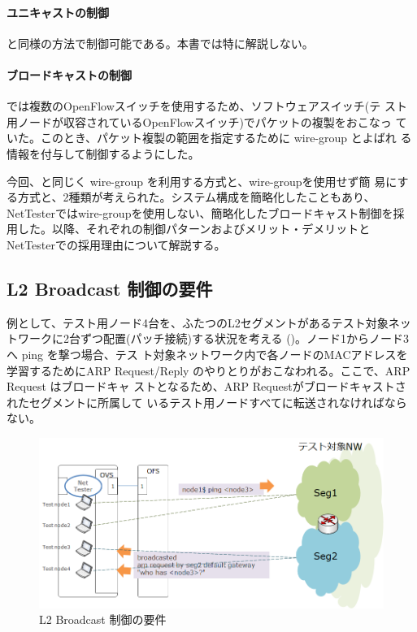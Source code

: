     \paragraph{ユニキャストの制御}

\lopj と同様の方法で制御可能である。本書では特に解説しない。

    \paragraph{ブロードキャストの制御}

\lopj では複数のOpenFlowスイッチを使用するため、ソフトウェアスイッチ(テ
スト用ノードが収容されているOpenFlowスイッチ)でパケットの複製をおこなっ
ていた。このとき、パケット複製の範囲を指定するために wire-group とよばれ
る情報を付与して制御するようにした。

今回、\lopj と同じく wire-group を利用する方式と、wire-groupを使用せず簡
易にする方式と、2種類が考えられた。システム構成を簡略化したこともあり、
NetTesterではwire-groupを使用しない、簡略化したブロードキャスト制御を採
用した。以降、それぞれの制御パターンおよびメリット・デメリットと
NetTesterでの採用理由について解説する。

  \subsection{L2 Broadcast 制御の要件}
  \label{sec:l2bcctrl-requirement}

例として、テスト用ノード4台を、ふたつのL2セグメントがあるテスト対象ネッ
トワークに2台ずつ配置(パッチ接続)する状況を考える
()。ノード1からノード3へ ping を撃つ場合、テス
ト対象ネットワーク内で各ノードのMACアドレスを学習するためにARP
Request/Reply のやりとりがおこなわれる。ここで、ARP Request はブロードキャ
ストとなるため、ARP Requestがブロードキャストされたセグメントに所属して
いるテスト用ノードすべてに転送されなければならない。

\begin{figure}[h]
 \centering
 \includegraphics[scale=0.6]{img/l2bcctrl_req1.png}
 \caption{L2 Broadcast 制御の要件}
 \label{fig:l2bcctrl_req1}
\end{figure}

